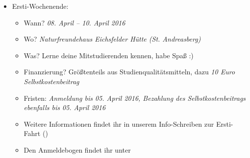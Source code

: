 \begin{itemize}
	\item Ersti-Wochenende:
	\begin{itemize}
		\item Wann? \emph{08. April – 10. April 2016}
		\item Wo? \emph{Naturfreundehaus Eichsfelder Hütte (St. Andreasberg)}
		\item Was? Lerne deine Mitstudierenden kennen, habe Spaß :)
		\item Finanzierung? Größtenteils aus Studienqualitätsmitteln, dazu \emph{10 Euro Selbstkostenbeitrag}
		\item Fristen: \emph{Anmeldung bis 05. April 2016, Bezahlung des Selbstkostenbeitrags ebenfalls bis 05. April 2016}
		\item Weitere Informationen findet ihr in unserem Info-Schreiben zur Ersti-Fahrt ()
		\item Den Anmeldebogen findet ihr unter 
	\end{itemize}
\end{itemize}